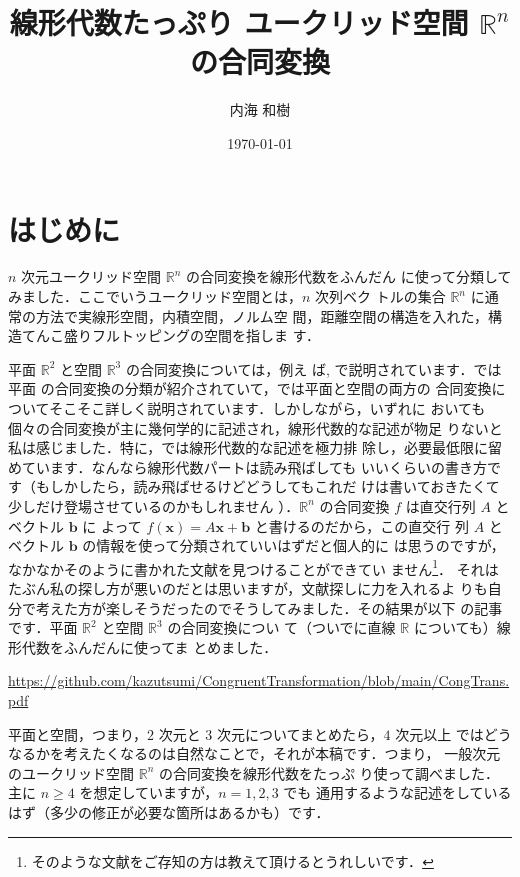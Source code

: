 \documentclass[11pt, uplatex, dvipdfmx, titlepage]{jsarticle}
\theoremstyle{definition}
\begin{document}
\title{線形代数たっぷり ユークリッド空間 $\mathbb{R}^n$ の合同変換}
\author{内海 和樹}
\date{\today}

\maketitle
  


\section*{はじめに}


$n$ 次元ユークリッド空間 $\mathbb{R}^n$ の合同変換を線形代数をふんだん
に使って分類してみました．ここでいうユークリッド空間とは，$n$ 次列ベク
トルの集合 $\mathbb{R}^n$ に通常の方法で実線形空間，内積空間，ノルム空
間，距離空間の構造を入れた，構造てんこ盛りフルトッピングの空間を指しま
す．

平面 $\mathbb{R}^2$ と空間 $\mathbb{R}^3$ の合同変換については，例え
ば\cite{Kawasaki}, \cite{Kouno}で説明されています．\cite{Kouno}では平面
の合同変換の分類が紹介されていて，\cite{Kawasaki}では平面と空間の両方の
合同変換についてそこそこ詳しく説明されています．しかしながら，いずれに
おいても個々の合同変換が主に幾何学的に記述され，線形代数的な記述が物足
りないと私は感じました．特に，\cite{Kouno}では線形代数的な記述を極力排
除し，必要最低限に留めています．なんなら線形代数パートは読み飛ばしても
いいくらいの書き方です（もしかしたら，読み飛ばせるけどどうしてもこれだ
けは書いておきたくて少しだけ登場させているのかもしれません
）．$\mathbb{R}^n$ の合同変換 $f$ は直交行列 $A$ とベクトル $\bm{b}$ に
よって $f(\bm{x}) = A\bm{x} + \bm{b}$ と書けるのだから，この直交行
列 $A$ とベクトル $\bm{b}$ の情報を使って分類されていいはずだと個人的に
は思うのですが，なかなかそのように書かれた文献を見つけることができてい
ません\footnote{そのような文献をご存知の方は教えて頂けるとうれしいです．}．
それはたぶん私の探し方が悪いのだとは思いますが，文献探しに力を入れるよ
りも自分で考えた方が楽しそうだったのでそうしてみました．その結果が以下
の記事です．平面 $\mathbb{R}^2$ と空間 $\mathbb{R}^3$ の合同変換につい
て（ついでに直線 $\mathbb{R}$ についても）線形代数をふんだんに使ってま
とめました．
\begin{center}
  \url{https://github.com/kazutsumi/CongruentTransformation/blob/main/CongTrans.pdf}
\end{center}
平面と空間，つまり，$2$ 次元と $3$ 次元についてまとめたら，$4$ 次元以上
ではどうなるかを考えたくなるのは自然なことで，それが本稿です．つまり，
一般次元のユークリッド空間 $\mathbb{R}^n$ の合同変換を線形代数をたっぷ
り使って調べました．主に $n \geq 4$ を想定していますが，$n=1,2,3$ でも
通用するような記述をしているはず（多少の修正が必要な箇所はあるかも）です．
\end{document}
